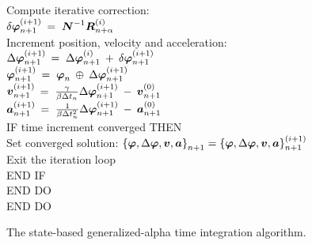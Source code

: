 \begin{figure}[t]
\begin{tabbing}
Compute iterative correction: \\
$\delta\bm{\varphi}_\np1^{(i+1)}$ \>\> $=\; \mbox{\boldmath $N$}^{-1} \mbox{\boldmath $R$}_{n+\alpha}^{(i)}$ \\[2mm]

Increment position, velocity and acceleration:\\
$\Delta\bm{\varphi}_\np1^{(i+1)}$ \>\> $=\; \Delta\bm{\varphi}_\np1^{(i)} \:+\: \delta\bm{\varphi}_\np1^{(i+1)}$ \\[1mm]
$\bm{\varphi}_\np1^{(i+1)}$ \>\> $=\; \bm{\varphi}_n \:\oplus\: \Delta\bm{\varphi}_\np1^{(i+1)}$ \\[1mm]
$\bm{v}_\np1^{(i+1)}$ \>\> $=\; \frac{\gamma}{\beta\Delta t_n}\Delta\bm{\varphi}_\np1^{(i+1)} \:-\: \bm{v}_\np1^{(0)}$ \\[1mm]
$\bm{a}_\np1^{(i+1)}$ \>\> $=\; \frac{1}{\beta\Delta t_n^2}\Delta\bm{\varphi}_\np1^{(i+1)} \:-\: \bm{a}_\np1^{(0)}$ \\[2mm]

IF time increment converged THEN \+\\[1mm]
Set converged solution: $\left\{\bm{\varphi},\Delta\bm{\varphi},\bm{v},\bm{a}\right\}_\np1 =
\left\{\bm{\varphi},\Delta\bm{\varphi},\bm{v},\bm{a}\right\}_\np1^{(i+1)}$ \\[1mm]
Exit the iteration loop \-\\[1mm]
END IF \-\\[1mm]
END DO \-\\[1mm]
END DO
\end{tabbing}
\caption{The state-based generalized-alpha time integration algorithm.}
\label{fig:GeneralizedAlpha}
\end{figure}
